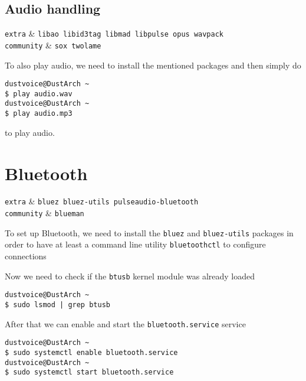 \documentclass[10pt]{dustdoc}
\begin{document}
\subsection{Audio handling}
\label{sec:audio-handling}

\begin{packagetable}
    \texttt{extra} & \texttt{libao libid3tag libmad libpulse opus wavpack} \\
    \texttt{community} & \texttt{sox twolame} \\
\end{packagetable}

To also play audio, we need to install the mentioned packages and then simply do

\begin{verbatim}
dustvoice@DustArch ~
$ play audio.wav
dustvoice@DustArch ~
$ play audio.mp3
\end{verbatim}

\noindent
to play audio.

\section{Bluetooth}
\label{sec:bluetooth}

\begin{packagetable}
    \texttt{extra} & \texttt{bluez bluez-utils pulseaudio-bluetooth} \\
    \texttt{community} & \texttt{blueman} \\
\end{packagetable}

To set up Bluetooth, we need to install the \texttt{bluez} and \texttt{bluez-utils} packages in order to have at least a command line utility \texttt{bluetoothctl} to configure connections

Now we need to check if the \texttt{btusb} kernel module was already loaded

\begin{verbatim}
dustvoice@DustArch ~
$ sudo lsmod | grep btusb
\end{verbatim}

After that we can enable and start the \texttt{bluetooth.service} service

\begin{verbatim}
dustvoice@DustArch ~
$ sudo systemctl enable bluetooth.service
dustvoice@DustArch ~
$ sudo systemctl start bluetooth.service
\end{verbatim}
\end{document}
